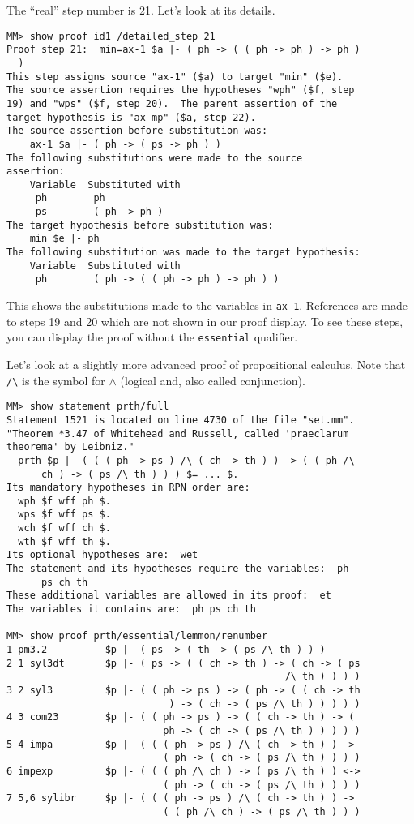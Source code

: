 The ``real'' step number is 21.  Let's look at its details.

\begin{verbatim}
MM> show proof id1 /detailed_step 21
Proof step 21:  min=ax-1 $a |- ( ph -> ( ( ph -> ph ) -> ph )
  )
This step assigns source "ax-1" ($a) to target "min" ($e).
The source assertion requires the hypotheses "wph" ($f, step
19) and "wps" ($f, step 20).  The parent assertion of the
target hypothesis is "ax-mp" ($a, step 22).
The source assertion before substitution was:
    ax-1 $a |- ( ph -> ( ps -> ph ) )
The following substitutions were made to the source
assertion:
    Variable  Substituted with
     ph        ph
     ps        ( ph -> ph )
The target hypothesis before substitution was:
    min $e |- ph
The following substitution was made to the target hypothesis:
    Variable  Substituted with
     ph        ( ph -> ( ( ph -> ph ) -> ph ) )
\end{verbatim}

This shows the substitutions made to the variables in \texttt{ax-1}.  References are made to
steps 19 and 20 which are not shown in our proof display.  To see these steps,
you can display the proof without the \texttt{essential} qualifier.

Let's look at a slightly more advanced proof of propositional calculus.  Note
that \verb+/\+ is the symbol for $\wedge$ (logical {\sc and}, also
called conjunction).

\begin{verbatim}
MM> show statement prth/full
Statement 1521 is located on line 4730 of the file "set.mm".
"Theorem *3.47 of Whitehead and Russell, called 'praeclarum
theorema' by Leibniz."
  prth $p |- ( ( ( ph -> ps ) /\ ( ch -> th ) ) -> ( ( ph /\
      ch ) -> ( ps /\ th ) ) ) $= ... $.
Its mandatory hypotheses in RPN order are:
  wph $f wff ph $.
  wps $f wff ps $.
  wch $f wff ch $.
  wth $f wff th $.
Its optional hypotheses are:  wet
The statement and its hypotheses require the variables:  ph
      ps ch th
These additional variables are allowed in its proof:  et
The variables it contains are:  ph ps ch th

MM> show proof prth/essential/lemmon/renumber
1 pm3.2          $p |- ( ps -> ( th -> ( ps /\ th ) ) )
2 1 syl3dt       $p |- ( ps -> ( ( ch -> th ) -> ( ch -> ( ps
                                                /\ th ) ) ) )
3 2 syl3         $p |- ( ( ph -> ps ) -> ( ph -> ( ( ch -> th
                            ) -> ( ch -> ( ps /\ th ) ) ) ) )
4 3 com23        $p |- ( ( ph -> ps ) -> ( ( ch -> th ) -> (
                           ph -> ( ch -> ( ps /\ th ) ) ) ) )
5 4 impa         $p |- ( ( ( ph -> ps ) /\ ( ch -> th ) ) ->
                           ( ph -> ( ch -> ( ps /\ th ) ) ) )
6 impexp         $p |- ( ( ( ph /\ ch ) -> ( ps /\ th ) ) <->
                           ( ph -> ( ch -> ( ps /\ th ) ) ) )
7 5,6 sylibr     $p |- ( ( ( ph -> ps ) /\ ( ch -> th ) ) ->
                           ( ( ph /\ ch ) -> ( ps /\ th ) ) )
\end{verbatim}

